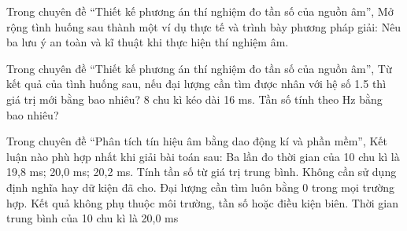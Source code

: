\begin{ex}
Trong chuyên đề “Thiết kế phương án thí nghiệm đo tần số của nguồn âm”, Mở rộng tình huống sau thành một ví dụ thực tế và trình bày phương pháp giải: Nêu ba lưu ý an toàn và kĩ thuật khi thực hiện thí nghiệm âm.
\choiceTF

\end{ex}

\begin{ex}
Trong chuyên đề “Thiết kế phương án thí nghiệm đo tần số của nguồn âm”, Từ kết quả của tình huống sau, nếu đại lượng cần tìm được nhân với hệ số 1.5 thì giá trị mới bằng bao nhiêu? 8 chu kì kéo dài 16 ms. Tần số tính theo Hz bằng bao nhiêu?
\end{ex}

\begin{ex}
Trong chuyên đề “Phân tích tín hiệu âm bằng dao động kí và phần mềm”, Kết luận nào phù hợp nhất khi giải bài toán sau: Ba lần đo thời gian của 10 chu kì là 19,8 ms; 20,0 ms; 20,2 ms. Tính tần số từ giá trị trung bình.
\choice
{Không cần sử dụng định nghĩa hay dữ kiện đã cho.}
{Đại lượng cần tìm luôn bằng 0 trong mọi trường hợp.}
{Kết quả không phụ thuộc môi trường, tần số hoặc điều kiện biên.}
{\True Thời gian trung bình của 10 chu kì là 20,0 ms}
\end{ex}

